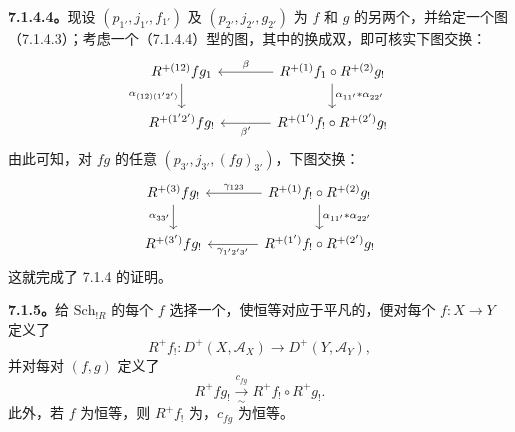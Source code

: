 \textbf{7.1.4.4。}现设 $(p_{1'},j_{1'},f_{1'})$ 及 $(p_{2'},j_{2'},g_{2'})$ 为 $f$ 和 $g$ 的另两个，并给定一个图（7.1.4.3）；考虑一个（7.1.4.4）型的图，其中的换成双，即可核实下图交换：
\[
\begin{tikzcd}[column sep=large]
R^{+(12)}fg_1\arrow[d,"\alpha_{(12)(1'2')}"']&R^{+(1)}f_1\circ R^{+(2)}g_!\arrow[l,"\beta"']\arrow[d,"\alpha_{11'}*\alpha_{22'}"]\\
R^{+(1'2')}fg_!&R^{+(1')}f_!\circ R^{+(2')}g_!\arrow[l,"\beta'"]
\end{tikzcd}
\]
由此可知，对 $fg$ 的任意 $(p_{3'},j_{3'},(fg)_{3'})$，下图交换：
\[
\begin{tikzcd}[column sep=large]
R^{+(3)}fg_!\arrow[d,"\alpha_{33'}"']&R^{+(1)}f_!\circ R^{+(2)}g_!\arrow[l,"\gamma_{123}"']\arrow[d,"\alpha_{11'}*\alpha_{22'}"]\\
R^{+(3')}fg_!&R^{+(1')}f_!\circ R^{+(2')}g_!\arrow[l,"\gamma_{1'2'3'}"]
\end{tikzcd}
\]
这就完成了 7.1.4 的证明。

\textbf{7.1.5。}给 $\mathrm{Sch}_{!R}$ 的每个 $f$ 选择一个，使恒等对应于平凡的，便对每个 $f:X\to Y$ 定义了
\[R^+f_!:D^+(X,\mathscr A_X)\longrightarrow D^+(Y,\mathscr A_Y),\]
并对每对 $(f,g)$ 定义了
\[R^+fg_!\xrightarrow[\sim]{c_{fg}}R^+f_!\circ R^+g_!.\]
此外，若 $f$ 为恒等，则 $R^+f_!$ 为，$c_{fg}$ 为恒等。


